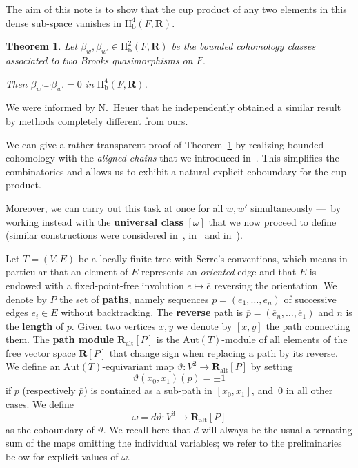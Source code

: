 \documentclass[11pt, a4paper]{amsart}
\newcommand{\RR}{\mathbf{R}}
\newcommand{\teta}{\vartheta}
\newcommand{\Aut}{\mathrm{Aut}}
\newcommand{\path}{P}
\newcommand{\pathmod}{\RR_\mathrm{alt}[P]}
\newcommand{\hb}{\mathrm{H}_\mathrm{b}}
\newcommand{\ol}{\overline}
\newcommand{\cp}{\mathbin{\smallsmile}}
\theoremstyle{plain}
\newtheorem{thm}{Theorem}
\begin{document}
\smallskip

The aim of this note is to show that the cup product of any two elements in this dense sub-space vanishes in $\hb^4(F,\RR)$.

\begin{thm}\label{thm:cupOnF} 
Let $\beta_w,\beta_{w'}\in \hb^2(F,\RR)$ be the bounded cohomology classes associated to two Brooks quasimorphisms on $F$.

Then $\beta_w\cp \beta_{w'}=0$ in $\hb^4(F,\RR)$.
\end{thm}

We were informed by N.~Heuer that he independently obtained a similar result~\cite{Heuer_arx} by methods completely different from ours.

\medskip

We can give a rather transparent proof of Theorem~\ref{thm:cupOnF} by realizing bounded cohomology with the \emph{aligned chains} that we introduced in~\cite{Bucher-Monod_tree_inpress}. This simplifies the combinatorics and allows us to exhibit a natural explicit coboundary for the cup product.

Moreover, we can carry out this task at once for all $w, w'$ simultaneously ---~by working instead with the \textbf{universal class} $[\omega]$ that we now proceed to define (similar constructions were considered in~\cite[\S2]{Monod-ShalomCRAS}, in~\cite[7.11]{Monod-Shalom1} and in~\cite[\S9]{Duchesne-Monod_dendritesARX}).

\medskip

Let $T=(V, E)$ be a locally finite tree with Serre's conventions, which means in particular that an element of $E$ represents an \emph{oriented} edge and that $E$ is endowed with a fixed-point-free involution $e\mapsto\overline e$ reversing the orientation. We denote by $\path$ the set of \textbf{paths}, namely sequences $p=(e_1, \ldots, e_n)$ of successive edges $e_i\in E$ without backtracking. The \textbf{reverse} path is $\overline p = (\overline e_n, \ldots, \overline e_1)$ and $n$ is the \textbf{length} of $p$. Given two vertices $x,y$ we denote by $[x,y]$ the path connecting them. The \textbf{path module} $\pathmod$ is the $\Aut(T)$-module of all elements of the free vector space $\RR[\path]$ that change sign when replacing a path by its reverse. We define an $\Aut(T)$-equivariant  map $\teta\colon V^2\to\pathmod$ by setting
%
$$\teta(x_0, x_1)(p)= \pm 1$$
%
if $p$ (respectively $\ol p$) is contained as a sub-path in $[x_0, x_1]$, and~$0$ in all other cases. We define
%
$$\omega=d\teta\colon V^3\to\pathmod$$
%
as the coboundary of $\teta$. We recall here that $d$ will always be the usual alternating sum of the maps omitting the individual variables; we refer to the preliminaries below for explicit values of $\omega$.
\end{document}
